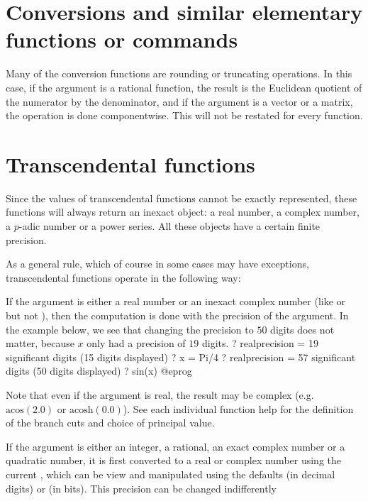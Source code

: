 \section{Conversions and similar elementary functions or commands}
\label{se:conversion}

\noindent
Many of the conversion functions are rounding or truncating operations. In
this case, if the argument is a rational function, the result is the
Euclidean quotient of the numerator by the denominator, and if the argument
is a vector or a matrix, the operation is done componentwise. This will not
be restated for every function.


\section{Transcendental functions}\label{se:trans}

Since the values of transcendental functions cannot be exactly represented,
these functions will always return an inexact object: a real number,
a complex number, a $p$-adic number or a power series.  All these objects
have a certain finite precision.

As a general rule, which of course in some cases may have exceptions,
transcendental functions operate in the following way:

\item If the argument is either a real number or an inexact complex number
(like  or  but not ), then the
computation is done with the precision of the argument.
In the example below, we see that changing the precision to $50$ digits does
not matter, because $x$ only had a precision of $19$ digits.
\bprog
? 
   realprecision = 19 significant digits (15 digits displayed)
? x = Pi/4
? 
   realprecision = 57 significant digits (50 digits displayed)
? sin(x)
@eprog

Note that even if the argument is real, the result may be complex
(e.g.~$\text{acos}(2.0)$ or $\text{acosh}(0.0)$). See each individual
function help for the definition of the branch cuts and choice of principal
value.

\item If the argument is either an integer, a rational, an exact complex
number or a quadratic number, it is first converted to a real
or complex number using the current , which can be
view and manipulated using the defaults  (in decimal
digits) or  (in bits). This precision can be changed
indifferently

